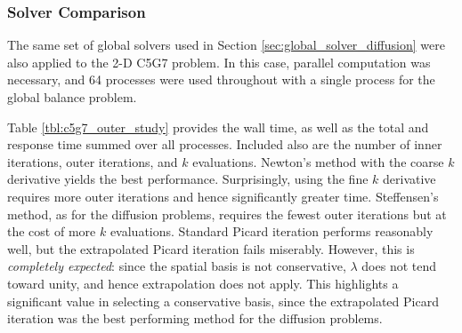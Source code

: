 \subsubsection{Solver Comparison}

The same set of global solvers used in 
Section \ref{sec:global_solver_diffusion} were also applied 
to the 2-D C5G7 problem.  In this case, parallel computation 
was necessary, and 64 processes were used throughout with a 
single process for the global balance problem.

Table \ref{tbl:c5g7_outer_study} provides the wall time,
as well as the total and response time summed over all 
processes.  Included also are the number of inner iterations,
outer iterations, and $k$ evaluations.  Newton's method with the 
coarse $k$ derivative yields the best performance.  Surprisingly,
using the fine $k$ derivative requires more outer iterations and 
hence significantly greater time.  Steffensen's method, as for the 
diffusion problems, requires the fewest outer iterations but at the 
cost of more $k$ evaluations.  Standard Picard iteration 
performs reasonably well, but the extrapolated Picard iteration
fails miserably.  However, this is {\it completely expected}: since 
the spatial basis is not conservative,  $\lambda$ does not 
tend toward unity, and hence extrapolation does not apply.  This 
highlights a significant value in selecting a conservative basis, 
since the extrapolated Picard iteration was the best performing 
method for the diffusion problems.

